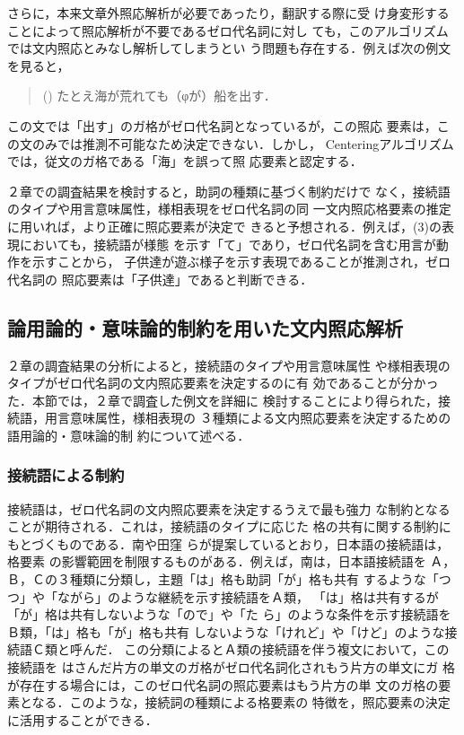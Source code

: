 さらに，本来文章外照応解析が必要であったり，翻訳する際に受
け身変形することによって照応解析が不要であるゼロ代名詞に対し
ても，このアルゴリズムでは文内照応とみなし解析してしまうとい
う問題も存在する．例えば次の例文を見ると，

\begin{quote}
() たとえ海が荒れても（φが）船を出す．
\end{quote}

\noindent
この文では「出す」のガ格がゼロ代名詞となっているが，この照応
要素は，この文のみでは推測不可能なため決定できない．しかし，
Centeringアルゴリズムでは，従文のガ格である「海」を誤って照
応要素と認定する．

２章での調査結果を検討すると，助詞の種類に基づく制約だけで
なく，接続語のタイプや用言意味属性，様相表現をゼロ代名詞の同
一文内照応格要素の推定に用いれば，より正確に照応要素が決定で
きると予想される．例えば，(3)の表現においても，接続語が様態
を示す「て」であり，ゼロ代名詞を含む用言が動作を示すことから，
子供達が遊ぶ様子を示す表現であることが推測され，ゼロ代名詞の
照応要素は「子供達」であると判断できる．

\newpage

\subsection{論用論的・意味論的制約を用いた文内照応解析}

２章の調査結果の分析によると，接続語のタイプや用言意味属性
や様相表現のタイプがゼロ代名詞の文内照応要素を決定するのに有
効であることが分かった．本節では，２章で調査した例文を詳細に
検討することにより得られた，接続語，用言意味属性，様相表現の
３種類による文内照応要素を決定するための語用論的・意味論的制
約について述べる．

\subsubsection{接続語による制約}

接続語は，ゼロ代名詞の文内照応要素を決定するうえで最も強力
な制約となることが期待される．これは，接続語のタイプに応じた
格の共有に関する制約にもとづくものである．南\cite{Minami1974}や田窪
\cite{Takubo1987}らが提案しているとおり，日本語の接続語は，格要素
の影響範囲を制限するものがある．例えば，南は，日本語接続語を
Ａ，Ｂ，Ｃの３種類に分類し，主題「は」格も助詞「が」格も共有
するような「つつ」や「ながら」のような継続を示す接続語をＡ類，
「は」格は共有するが「が」格は共有しないような「ので」や「た
ら」のような条件を示す接続語をＢ類，「は」格も「が」格も共有
しないような「けれど」や「けど」のような接続語Ｃ類と呼んだ．
この分類によるとＡ類の接続語を伴う複文において，この接続語を
はさんだ片方の単文のガ格がゼロ代名詞化されもう片方の単文にガ
格が存在する場合には，このゼロ代名詞の照応要素はもう片方の単
文のガ格の要素となる．このような，接続詞の種類による格要素の
特徴を，照応要素の決定に活用することができる．

